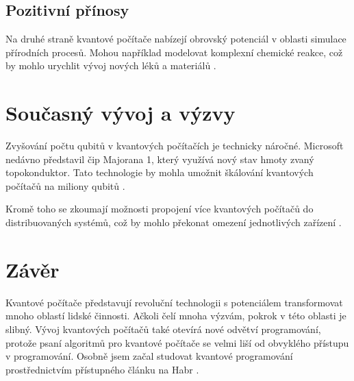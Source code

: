 \documentclass[a4paper,11pt]{article}
\begin{document}
\subsection{Pozitivní přínosy}
Na druhé straně kvantové počítače nabízejí obrovský potenciál v oblasti simulace přírodních procesů\cite{james2011sim}. Mohou například modelovat komplexní chemické reakce, což by mohlo urychlit vývoj nových léků a materiálů \cite{De_Wolf2017-ku}.

\section{Současný vývoj a výzvy}
Zvyšování počtu qubitů v kvantových počítačích je technicky náročné. Microsoft nedávno představil čip Majorana 1, který využívá nový stav hmoty zvaný topokonduktor. Tato technologie by mohla umožnit škálování kvantových počítačů na miliony qubitů \cite{microsoft2025break}.

Kromě toho se zkoumají možnosti propojení více kvantových počítačů do distribuovaných systémů, což by mohlo překonat omezení jednotlivých zařízení \cite{carter2024qcUni}.

\section{Závěr}
Kvantové počítače představují revoluční technologii s potenciálem transformovat mnoho oblastí lidské činnosti. Ačkoli čelí mnoha výzvám, pokrok v této oblasti je slibný. Vývoj kvantových počítačů také otevírá nové odvětví programování, protože psaní algoritmů pro kvantové počítače se velmi liší od obvyklého přístupu v programování\cite{algo1999mosca}. Osobně jsem začal studovat kvantové programování prostřednictvím přístupného článku na Habr \cite{habr2020}.



\end{document}
